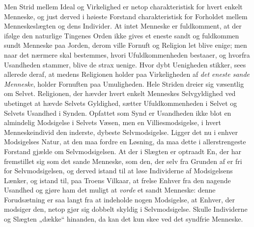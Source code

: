 \documentclass[12pt]{book}
\begin{document}
Men Strid mellem Ideal og Virkelighed er netop charakteristisk for
hvert enkelt Menneske, og just derved i høieste Forstand
charakteristisk for Forholdet mellem Menneskeslægten og dens
Individer. At intet Menneske er fuldkomment, at der ifølge den
naturlige Tingenes Orden ikke gives et eneste sandt og fuldkommen
sundt Menneske paa Jorden, derom ville Fornuft og Religion let blive
enige; men naar det nærmere skal bestemmes, hvori Ufuldkommenheden
bestaaer, og hvorfra Usandheden stammer, blive de strax uenige. Hvor
dybt Uenigheden stikker, sees allerede deraf, at medens Religionen
holder paa Virkeligheden af
\emph{det eneste sande Menneske}, holder Fornuften paa Umuligheden.
Hele Striden dreier sig væsentlig om Selvet. Religionen, der hævder
hvert enkelt Menneskes Selvgyldighed ved ubetinget at hævde Selvets
Gyldighed, sætter Ufuldkommenheden i Selvet og Selvets Usandhed i
Synden. Opfattet som Synd er Usandheden ikke blot en almindelig
Modsigelse i Selvets Væsen, men en Villiesmodsigelse, i hvert
Menneskeindivid den inderste, dybeste Selvmodsigelse. Ligger det nu
i enhver Modsigelses Natur, at den maa fordre en Løsning, da maa
dette i allerstrengeste Forstand gjælde om Selvmodsigelsen. At der i
Slægten er optraadt En, der har fremstillet sig som det sande
Menneske, som den, der selv fra Grunden af er fri for
Selvmodsigelsen, og derved istand til at løse Individerne af
Modsigelsens Lænker, og istand til, paa Troens Vilkaar, at frelse
Enhver fra den nagende Usandhed og gjøre ham det muligt at
\emph{vorde} et sandt Menneske: denne Forudsætning er saa langt fra
at indeholde nogen Modsigelse, at Enhver, der modsiger den, netop
gjør sig dobbelt skyldig i Selvmodsigelse. Skulle Individerne og
Slægten „dække“ hinanden, da kan det kun skee ved det syndfrie
Menneske.
\end{document}
